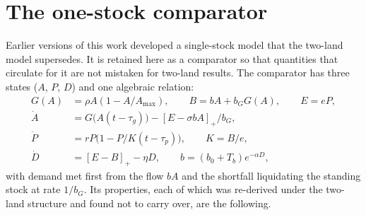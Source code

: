 \documentclass[11pt,a4paper]{article}
\newcommand{\pos}[1]{\left[#1\right]_+}
\begin{document}
\section{The one-stock comparator}\label{si:onestock}

Earlier versions of this work developed a single-stock model that the two-land model supersedes. It is retained here as a comparator so that quantities that circulate for it are not mistaken for two-land results. The comparator has three states ($A$, $P$, $D$) and one algebraic relation:
\begin{align}
G(A)&=\rho A(1-A/A_{\max}),\qquad B=bA+b_GG(A),\qquad E=eP,\\
\dot A&=G\big(A(t-\tau_g)\big)-\pos{E-\sigma bA}/b_G,\\
\dot P&=rP\big(1-P/K(t-\tau_p)\big),\qquad K=B/e,\\
\dot D&=\pos{E-B}-\eta D,\qquad b=(b_0+T_b)e^{-\alpha D},
\end{align}
with demand met first from the flow $bA$ and the shortfall liquidating the standing stock at rate $1/b_G$. Its properties, each of which was re-derived under the two-land structure and found not to carry over, are the following.
\end{document}

